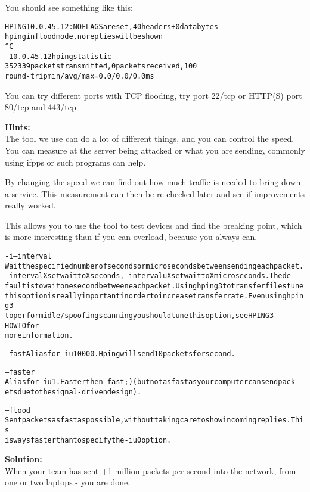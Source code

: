 \documentclass[a4paper,11pt,notitlepage]{report}
\begin{document}
You should see something like this:
\begin{alltt}\footnotesize
HPING 10.0.45.12: NO FLAGS are set, 40 headers + 0 data bytes
hping in flood mode, no replies will be shown
^C
--- 10.0.45.12 hping statistic ---
352339 packets transmitted, 0 packets received, 100% packet loss
round-trip min/avg/max = 0.0/0.0/0.0 ms
\end{alltt}

You can try different ports with TCP flooding, try port 22/tcp or HTTP(S) port 80/tcp and 443/tcp


{\bf Hints:}\\
The tool we use can do a lot of different things, and you can control the speed. You can measure at the server being attacked or what you are sending, commonly using ifpps or such programs can help.

By changing the speed we can find out how much traffic is needed to bring down a service. This measurement can then be re-checked later and see if improvements really worked.

This allows you to use the tool to test devices and find the breaking point, which is more interesting than if you can overload, because you always can.
\begin{alltt}\footnotesize
-i --interval
       Wait  the  specified  number  of  seconds or micro seconds between sending each packet.
       --interval X set wait to X seconds, --interval uX set wait to X micro seconds.  The de‐
       fault  is  to  wait one second between each packet. Using hping3 to transfer files tune
       this option is really important in order to increase transfer rate. Even  using  hping3
       to  perform  idle/spoofing  scanning  you should tune this option, see HPING3-HOWTO for
       more information.

--fast Alias for -i u10000. Hping will send 10 packets for second.

--faster
       Alias for -i u1. Faster then --fast ;) (but not as fast as your computer can send pack‐
       ets due to the signal-driven design).

--flood
       Sent  packets  as fast as possible, without taking care to show incoming replies.  This
       is ways faster than to specify the -i u0 option.
\end{alltt}

{\bf Solution:}\\
When your team has sent +1 million packets per second into the network, from one or two laptops - you are done.
\end{document}
